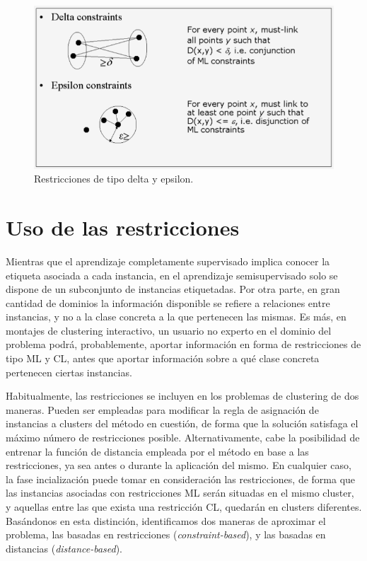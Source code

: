 \begin{figure}[!h]
	\centering
	\includegraphics[scale=0.45]{imagenes/c3/RestriccionesDeltaEpsilo.png} 
	\caption{Restricciones de tipo delta y epsilon. \cite{Survey:2007}}\label{fig:figure4}
\end{figure}

\clearpage

\section{Uso de las restricciones}

Mientras que el aprendizaje completamente supervisado implica conocer la etiqueta asociada a cada instancia, en el aprendizaje semisupervisado solo se dispone de un subconjunto de instancias etiquetadas. Por otra parte, en gran cantidad de dominios la información disponible se refiere a relaciones entre instancias, y no a la clase concreta a la que pertenecen las mismas. Es más, en montajes de clustering interactivo, un usuario no experto en el dominio del problema podrá, probablemente, aportar información en forma de restricciones de tipo \acf{ML} y \acf{CL}, antes que aportar información sobre a qué clase concreta pertenecen ciertas instancias.

Habitualmente, las restricciones se incluyen en los problemas de clustering de dos maneras. Pueden ser empleadas para modificar la regla de asignación de instancias a clusters del método en cuestión, de forma que la solución satisfaga el máximo número de restricciones posible. Alternativamente, cabe la posibilidad de entrenar la función de distancia empleada por el método en base a las restricciones, ya sea antes o durante la aplicación del mismo. En cualquier caso, la fase incialización puede tomar en consideración las restricciones, de forma que las instancias asociadas con restricciones \acf{ML} serán situadas en el mismo cluster, y aquellas entre las que exista una restricción \acf{CL}, quedarán en clusters diferentes. Basándonos en esta distinción, identificamos dos maneras de aproximar el problema, las basadas en restricciones (\textit{constraint-based}), y las basadas en distancias (\textit{distance-based}).

